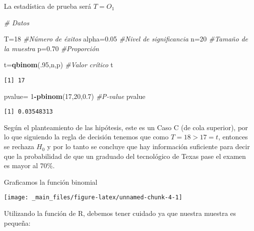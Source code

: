 \documentclass[
  a4paper,
  oneside,
  openany]{book}
\newenvironment{Shaded}{\begin{snugshade}}{\end{snugshade}}
\newcommand{\CommentTok}[1]{\textcolor[rgb]{0.56,0.35,0.01}{\textit{#1}}}
\newcommand{\DecValTok}[1]{\textcolor[rgb]{0.00,0.00,0.81}{#1}}
\newcommand{\FloatTok}[1]{\textcolor[rgb]{0.00,0.00,0.81}{#1}}
\newcommand{\FunctionTok}[1]{\textcolor[rgb]{0.13,0.29,0.53}{\textbf{#1}}}
\newcommand{\NormalTok}[1]{#1}
\newcommand{\OtherTok}[1]{\textcolor[rgb]{0.56,0.35,0.01}{#1}}
\newcommand{\SpecialCharTok}[1]{\textcolor[rgb]{0.81,0.36,0.00}{\textbf{#1}}}
\begin{document}
La estadística de prueba será \(T=O_1\)

\begin{Shaded}
\begin{Highlighting}[]
\CommentTok{\# Datos}

\NormalTok{T}\OtherTok{=}\DecValTok{18}                                   \CommentTok{\#Número de éxitos}
\NormalTok{alpha}\OtherTok{=}\FloatTok{0.05}                             \CommentTok{\#Nivel de significancia}
\NormalTok{n}\OtherTok{=}\DecValTok{20}                                   \CommentTok{\#Tamaño de la muestra}
\NormalTok{p}\OtherTok{=}\FloatTok{0.70}                                 \CommentTok{\#Proporción  }

\NormalTok{t}\OtherTok{=}\FunctionTok{qbinom}\NormalTok{(.}\DecValTok{95}\NormalTok{,n,p)                       }\CommentTok{\#Valor crítico}
\NormalTok{t}
\end{Highlighting}
\end{Shaded}

\begin{verbatim}
[1] 17
\end{verbatim}

\begin{Shaded}
\begin{Highlighting}[]
\NormalTok{pvalue}\OtherTok{=} \DecValTok{1}\SpecialCharTok{{-}}\FunctionTok{pbinom}\NormalTok{(}\DecValTok{17}\NormalTok{,}\DecValTok{20}\NormalTok{,}\FloatTok{0.7}\NormalTok{)                }\CommentTok{\#P{-}value}
\NormalTok{pvalue}
\end{Highlighting}
\end{Shaded}

\begin{verbatim}
[1] 0.03548313
\end{verbatim}

Según el planteamiento de las hipótesis, este es un Caso C (de cola superior), por lo que siguiendo la regla de decisión tenemos que como \(T=18>17=t\), entonces se rechaza \(H_0\) y por lo tanto se concluye que hay información suficiente para decir que la probabilidad de que un graduado del tecnológico de Texas pase el examen es mayor al 70\%.

Graficamos la función binomial

\begin{center}\texttt{[image: \_main\_files/figure-latex/unnamed-chunk-4-1]} \end{center}

Utilizando la función de R, debemos tener cuidado ya que nuestra muestra es pequeña:
\end{document}

